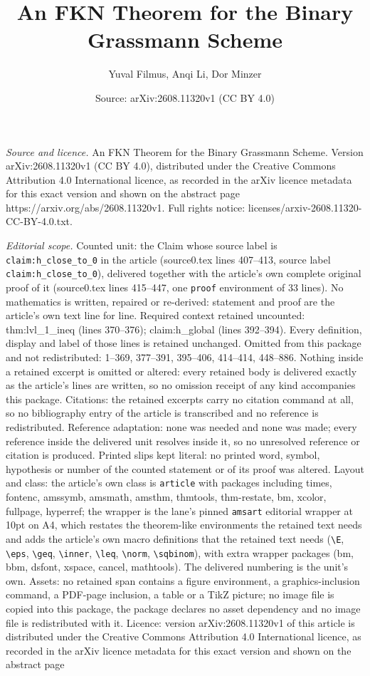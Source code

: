 \documentclass[10pt,a4paper]{amsart}
\title[An FKN Theorem for the Binary Grassmann Scheme]{An FKN Theorem for the Binary Grassmann Scheme}
\author{Yuval Filmus, Anqi Li, Dor Minzer}
\date{Source: arXiv:2608.11320v1 (CC BY 4.0)}
\begin{document}
\maketitle

\noindent\emph{Source and licence.} An FKN Theorem for the Binary Grassmann Scheme. Version arXiv:2608.11320v1 (CC BY 4.0), distributed under the Creative Commons Attribution 4.0 International licence, as recorded in the arXiv licence metadata for this exact version and shown on the abstract page https://arxiv.org/abs/2608.11320v1. Full rights notice: licenses/arxiv-2608.11320-CC-BY-4.0.txt.\par\smallskip

\noindent\textit{Editorial scope.} Counted unit: the Claim whose source label is \texttt{claim:h\_close\_to\_0} in the article (source0.tex lines 407--413, source label \texttt{claim:h\_close\_to\_0}), delivered together with the article's own complete original proof of it (source0.tex lines 415--447, one \texttt{proof} environment of 33 lines). No mathematics is written, repaired or re-derived: statement and proof are the article's own text line for line. Required context retained uncounted: thm:lvl\_1\_ineq (lines 370--376); claim:h\_global (lines 392--394). Every definition, display and label of those lines is retained unchanged. Omitted from this package and not redistributed: 1--369, 377--391, 395--406, 414--414, 448--886. Nothing inside a retained excerpt is omitted or altered: every retained body is delivered exactly as the article's lines are written, so no omission receipt of any kind accompanies this package. Citations: the retained excerpts carry no citation command at all, so no bibliography entry of the article is transcribed and no reference is redistributed. Reference adaptation: none was needed and none was made; every reference inside the delivered unit resolves inside it, so no unresolved reference or citation is produced. Printed slips kept literal: no printed word, symbol, hypothesis or number of the counted statement or of its proof was altered. Layout and class: the article's own class is \texttt{article} with packages including times, fontenc, amssymb, amsmath, amsthm, thmtools, thm-restate, bm, xcolor, fullpage, hyperref; the wrapper is the lane's pinned \texttt{amsart} editorial wrapper at 10pt on A4, which restates the theorem-like environments the retained text needs and adds the article's own macro definitions that the retained text needs (\texttt{\textbackslash E}, \texttt{\textbackslash eps}, \texttt{\textbackslash geq}, \texttt{\textbackslash inner}, \texttt{\textbackslash leq}, \texttt{\textbackslash norm}, \texttt{\textbackslash sqbinom}), with extra wrapper packages (bm, bbm, dsfont, xspace, cancel, mathtools). The delivered numbering is the unit's own. Assets: no retained span contains a figure environment, a graphics-inclusion command, a PDF-page inclusion, a table or a TikZ picture; no image file is copied into this package, the package declares no asset dependency and no image file is redistributed with it. Licence: version arXiv:2608.11320v1 of this article is distributed under the Creative Commons Attribution 4.0 International licence, as recorded in the arXiv licence metadata for this exact version and shown on the abstract page 
\end{document}
